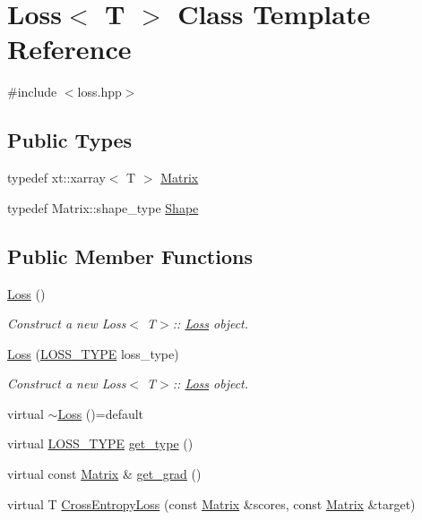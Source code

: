 \hypertarget{class_loss}{}\section{Loss$<$ T $>$ Class Template Reference}
\label{class_loss}


{\ttfamily \#include $<$loss.\+hpp$>$}

\subsection*{Public Types}
\begin{DoxyCompactItemize}
\item 
typedef xt\+::xarray$<$ T $>$ \mbox{\hyperlink{class_loss_a0cb2ca4ba669a18f628d747a995cd26c}{Matrix}}
\item 
typedef Matrix\+::shape\+\_\+type \mbox{\hyperlink{class_loss_a5523cc159d9a0707e9e3fd447f0a832a}{Shape}}
\end{DoxyCompactItemize}
\subsection*{Public Member Functions}
\begin{DoxyCompactItemize}
\item 
\mbox{\hyperlink{class_loss_a76394ddc3da09eb5d4929e1ea03a667c}{Loss}} ()
\begin{DoxyCompactList}\small\item\em Construct a new Loss$<$ T$>$\+:: \mbox{\hyperlink{class_loss}{Loss}} object. \end{DoxyCompactList}\item 
\mbox{\hyperlink{class_loss_a5b75c55ce90781d1b12d02f1bedbfa4f}{Loss}} (\mbox{\hyperlink{loss_8hpp_a72b6675b9bd68360ebc6e54006d8220f}{L\+O\+S\+S\+\_\+\+T\+Y\+PE}} loss\+\_\+type)
\begin{DoxyCompactList}\small\item\em Construct a new Loss$<$ T$>$\+:: \mbox{\hyperlink{class_loss}{Loss}} object. \end{DoxyCompactList}\item 
virtual \mbox{\hyperlink{class_loss_a93b96fb49b4fedae50e1b275062d9cc5}{$\sim$\+Loss}} ()=default
\item 
virtual \mbox{\hyperlink{loss_8hpp_a72b6675b9bd68360ebc6e54006d8220f}{L\+O\+S\+S\+\_\+\+T\+Y\+PE}} \mbox{\hyperlink{class_loss_a17a1565bd927d068dbb5f556874e7ae7}{get\+\_\+type}} ()
\item 
virtual const \mbox{\hyperlink{class_loss_a0cb2ca4ba669a18f628d747a995cd26c}{Matrix}} \& \mbox{\hyperlink{class_loss_a20cbb31f5e0bb747ba6f8ee6ba25648c}{get\+\_\+grad}} ()
\item 
virtual T \mbox{\hyperlink{class_loss_ad9278bd08a8e63a856f317b58c73195b}{Cross\+Entropy\+Loss}} (const \mbox{\hyperlink{class_loss_a0cb2ca4ba669a18f628d747a995cd26c}{Matrix}} \&scores, const \mbox{\hyperlink{class_loss_a0cb2ca4ba669a18f628d747a995cd26c}{Matrix}} \&target)
\end{DoxyCompactItemize}
